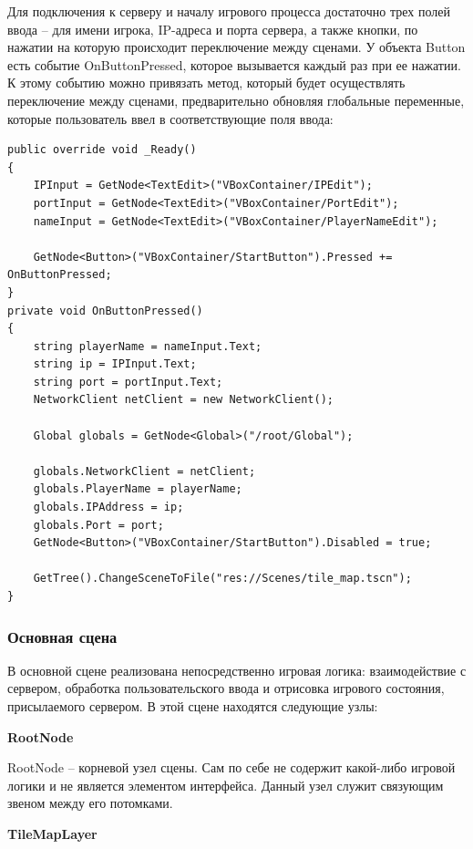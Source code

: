         Для подключения к серверу и началу игрового процесса достаточно трех полей ввода -- для имени игрока, IP-адреса и порта сервера, а также кнопки, по нажатии на которую происходит переключение между сценами. У объекта Button есть событие OnButtonPressed, которое вызывается каждый раз при ее нажатии. К этому событию можно привязать метод, который будет осуществлять переключение между сценами, предварительно обновляя глобальные переменные, которые пользователь ввел в соответствующие поля ввода:

        \begin{lstlisting}[caption=Реализация логики главного меню]
public override void _Ready()
{
    IPInput = GetNode<TextEdit>("VBoxContainer/IPEdit");
    portInput = GetNode<TextEdit>("VBoxContainer/PortEdit");
    nameInput = GetNode<TextEdit>("VBoxContainer/PlayerNameEdit");

    GetNode<Button>("VBoxContainer/StartButton").Pressed += OnButtonPressed;
}
private void OnButtonPressed()
{
    string playerName = nameInput.Text;
    string ip = IPInput.Text;
    string port = portInput.Text;
    NetworkClient netClient = new NetworkClient();

    Global globals = GetNode<Global>("/root/Global");

    globals.NetworkClient = netClient;
    globals.PlayerName = playerName;
    globals.IPAddress = ip;
    globals.Port = port;
    GetNode<Button>("VBoxContainer/StartButton").Disabled = true;

    GetTree().ChangeSceneToFile("res://Scenes/tile_map.tscn");
}
        \end{lstlisting}

        \subsubsection{Основная сцена}

            В основной сцене реализована непосредственно игровая логика: взаимодействие с сервером, обработка пользовательского ввода и отрисовка игрового состояния, присылаемого сервером. В этой сцене находятся следующие узлы:

            \textbf{RootNode}

            RootNode -- корневой узел сцены. Сам по себе не содержит какой-либо игровой логики и не является элементом интерфейса. Данный узел служит связующим звеном между его потомками. 
            
            \textbf{TileMapLayer}

